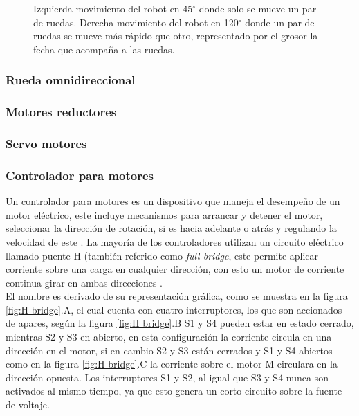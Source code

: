 \documentclass{iccmemoria}
\begin{document}
\begin{figure}[H]
  \centering
  \begin{footnotesize}
  
  \end{footnotesize}
  \caption{Izquierda movimiento del robot en 45$^{\circ}$ donde solo se mueve un par de ruedas. Derecha movimiento del robot en 120$^{\circ}$ donde un par de ruedas se mueve más rápido que otro, representado por el grosor la fecha que acompaña a las ruedas.}
  \label{fig:omni_movement_combined}
\end{figure}

\subsubsection{Rueda omnidireccional}

\subsubsection{Motores reductores}

\subsubsection{Servo motores}

\subsubsection{Controlador para motores}

Un controlador para motores es un dispositivo que maneja el desempeño de un motor eléctrico, este incluye mecanismos para arrancar y detener el motor, seleccionar la dirección de rotación, si es hacia adelante o atrás y regulando la velocidad de este \cite{siskind1963electrical}. La mayoría de los controladores utilizan un circuito eléctrico llamado puente H (también referido como \emph{full-bridge}, este permite aplicar corriente sobre una carga en cualquier dirección, con esto un motor de corriente continua girar en ambas direcciones \cite{williams2002microcontroller}.\\

El nombre es derivado de su representación gráfica, como se muestra en la figura \ref{fig:H bridge}.A, el cual cuenta con cuatro interruptores, los que son accionados de apares, según la figura \ref{fig:H bridge}.B S1 y S4 pueden estar en estado cerrado, mientras S2 y S3 en abierto, en esta configuración la corriente circula en una dirección en el motor, si en cambio S2 y S3 están cerrados y S1 y S4 abiertos como en la figura \ref{fig:H bridge}.C la corriente sobre el motor M circulara en la dirección opuesta. Los interruptores S1 y S2, al igual que S3 y S4 nunca son activados al mismo tiempo, ya que esto genera un corto circuito sobre la fuente de voltaje.\\
\end{document}
